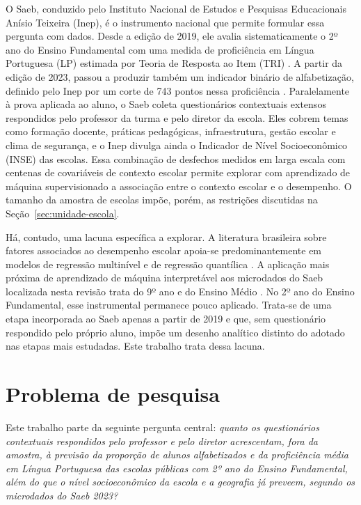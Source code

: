 O Saeb, conduzido pelo Instituto Nacional de Estudos e Pesquisas
Educacionais Anísio Teixeira (Inep), é o instrumento nacional que permite
formular essa pergunta com dados. Desde a edição de 2019, ele avalia
sistematicamente o 2º ano do Ensino Fundamental com uma medida de
proficiência em Língua Portuguesa (LP) estimada por Teoria de Resposta ao
Item (TRI) \cite{klein2003tri}. A partir da edição de 2023, passou a
produzir também um indicador binário de alfabetização, definido pelo Inep
por um corte de 743 pontos nessa proficiência \cite{inep2023alfabetiza}.
Paralelamente à prova aplicada ao aluno, o Saeb coleta questionários
contextuais extensos respondidos pelo professor da turma e pelo diretor da
escola. Eles cobrem temas como formação docente, práticas pedagógicas,
infraestrutura, gestão escolar e clima de segurança, e o Inep divulga
ainda o Indicador de Nível Socioeconômico (INSE) das escolas. Essa
combinação de desfechos medidos em larga escala com centenas de
covariáveis de contexto escolar permite explorar com aprendizado de máquina
supervisionado a associação entre o contexto escolar e o desempenho. O
tamanho da amostra de escolas impõe, porém, as restrições discutidas na
Seção~\ref{sec:unidade-escola}.

Há, contudo, uma lacuna específica a explorar. A literatura brasileira
sobre fatores associados ao desempenho escolar apoia-se predominantemente
em modelos de regressão multinível e de regressão quantílica
\cite{franco2007qualidade, alves2007efeito, almeida2014determinantes}. A
aplicação mais próxima de aprendizado de máquina interpretável aos
microdados do Saeb localizada nesta revisão trata do 9º ano e do Ensino
Médio \cite{tertulino2025multilevel}. No 2º ano do Ensino Fundamental, esse
instrumental permanece pouco aplicado. Trata-se de uma etapa incorporada ao
Saeb apenas a partir de 2019 e que, sem questionário respondido pelo
próprio aluno, impõe um desenho analítico distinto do adotado nas etapas
mais estudadas. Este trabalho trata dessa lacuna.

\section{Problema de pesquisa}
\label{sec:problema-pesquisa}

Este trabalho parte da seguinte pergunta central: \emph{quanto os
questionários contextuais respondidos pelo professor e pelo diretor
acrescentam, fora da amostra, à previsão da proporção de alunos
alfabetizados e da proficiência média em Língua Portuguesa das escolas
públicas com 2º ano do Ensino Fundamental, além do que o nível
socioeconômico da escola e a geografia já preveem, segundo os microdados
do Saeb 2023?}

